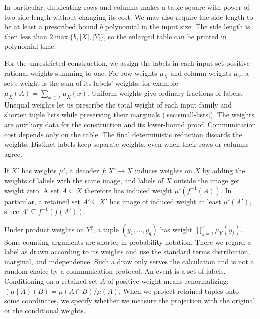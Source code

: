 \documentclass[11pt,letterpaper]{article} \usepackage[utf8]{inputenc}
\theoremstyle{plain} \newtheorem{theorem}{Theorem}[section]
\theoremstyle{definition} \newaliascnt{definition}{theorem}
\begin{document}
In particular, duplicating rows and columns makes a table square with
power-of-two side length without changing its cost. We may also
require the side length to be at least a prescribed bound $b$ polynomial in
the input size. The side length is then less than $2\max\{b,|X|,|Y|\}$, so
the enlarged table can be printed in polynomial time.

For the unrestricted construction, we assign the labels in each input set
positive rational weights summing to one. For row weights $\mu_X$ and column weights $\mu_Y$, a set's
weight is the sum of its labels' weights, for example
$\mu_X(A)=\sum_{x\in A}\mu_X(x)$. Uniform weights give ordinary fractions
of labels. Unequal weights let us prescribe the total weight of each input family
and shorten tuple lists while preserving their marginals (\cref{sec:small-lists}). The weights
are auxiliary data for the construction and its lower-bound proof.
Communication cost depends only on the table. The final deterministic reduction discards the weights.
Distinct labels keep separate weights, even when their rows or columns agree.

If $X'$ has weights $\mu'$, a decoder $f:X'\to X$ induces weights on $X$ by adding the weights of
labels with the same image, and labels of $X$ outside the image get weight zero. A set $A\subseteq X$ therefore has induced
weight $\mu'(f^{-1}(A))$. In particular, a retained set $A'\subseteq X'$
has image of induced weight at least $\mu'(A')$, since $A'\subseteq f^{-1}(f(A'))$.

Under product weights on $Y^q$, a tuple $(y_1,\ldots,y_q)$ has weight
$\prod_{j=1}^q\mu_Y(y_j)$.
Some counting arguments are shorter in probability notation. There we regard a label
as drawn according to its weights and use the standard terms distribution,
marginal, and independence. Such a draw only serves the calculation and is not a random
choice by a communication protocol. An event is a set of labels.
Conditioning on a retained set $A$ of
positive weight means renormalizing: $(\mu\mid A)(B)=\mu(A\cap B)/\mu(A)$.
When we project retained tuples onto some coordinates, we specify whether we
measure the projection with the original or the conditional weights.
\end{document}
